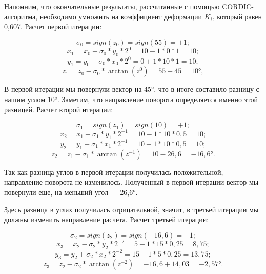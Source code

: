 \documentclass[a4paper,oneside ,14pt]{extreport}
\begin{document}
Напомним, что окончательные результаты, рассчитанные с помощью CORDIC-алгоритма, необходимо умножить на коэффициент 
деформации \(K_i\), который равен 0,607. Расчет первой итерации:

\begin{displaymath}	
\sigma_0 = sign(z_0) = sign(55) = + 1;
\end{displaymath}
\begin{displaymath}	
x_{1} = x_{0} - \sigma_0*y_0*2^{0} = 10 - 1*0*1 = 10;
\end{displaymath}
\begin{displaymath}
y_{1} = y_{0} + \sigma_0*x_0*2^{0} = 0 + 1*10*1 = 10;
\end{displaymath}
\begin{displaymath}	
z_{1} = z_{0} - \sigma_0*\arctan(z^{0}) = 55 - 45 = 10°,
\end{displaymath}

В первой итерации мы повернули вектор 
на 45°, что в итоге составило разницу с нашим углом 10°. Заметим, что направление поворота определяется именно этой разницей. Расчет второй итерации:

\begin{displaymath}	
\sigma_1 = sign(z_1) = sign(10) = + 1;
\end{displaymath}
\begin{displaymath}	
x_{2} = x_{1} - \sigma_1*y_1*2^{-1} = 10 - 1*10*0,5 = 10;
\end{displaymath}
\begin{displaymath}
y_{2} = y_{1} + \sigma_1*x_1*2^{-1} = 10 + 1*10*0,5 = 10;
\end{displaymath}
\begin{displaymath}	
z_{2} = z_{1} - \sigma_1*\arctan(z^{-1}) = 10 - 26,6 = -16,6°.
\end{displaymath}

Так как разница углов в первой итерации 
получилась положительной, направление 
поворота не изменилось. Полученный в первой итерации вектор мы повернули еще, 
на меньший угол — 26,6°.

Здесь разница в углах получилась отрицательной, значит, 
в третьей итерации мы должны изменить направление расчета.
Расчет третьей итерации:

\begin{displaymath}	
\sigma_2 = sign(z_2) = sign(-16,6) = - 1;
\end{displaymath}
\begin{displaymath}	
x_{3} = x_{2} - \sigma_2*y_2*2^{-2} = 5 + 1*15*0,25 = 8,75;
\end{displaymath}
\begin{displaymath}
y_{3} = y_{2} + \sigma_2*x_2*2^{-2} = 15 + 1*5*0,25 = 13,75;
\end{displaymath}
\begin{displaymath}	
z_{3} = z_{2} - \sigma_2*\arctan(z^{-2}) = -16,6 + 14,03 = -2,57°.
\end{displaymath}
\end{document}
